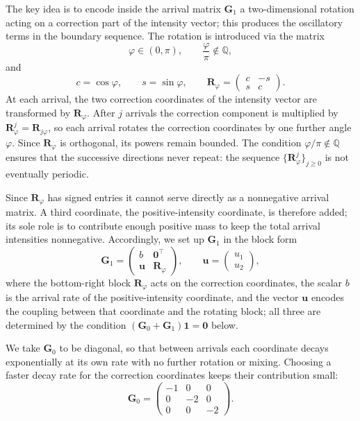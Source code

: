 \documentclass[11pt]{article}
\theoremstyle{definition}
\theoremstyle{remark}
\newcommand{\bzero}{\bm{0}}
\begin{document}
The key idea is to encode inside the arrival matrix $\bm{G}_1$ a two-dimensional rotation acting on a correction part of the intensity vector; this produces the oscillatory terms in the boundary sequence. The rotation is introduced via the matrix
\begin{equation}\label{eq:irrational}
\varphi\in(0,\pi),
\qquad
\frac{\varphi}{\pi}\notin\mathbb{Q},
\end{equation}
and
\[
c=\cos\varphi,
\qquad
s=\sin\varphi,
\qquad
\bm{R}_\varphi=
\begin{pmatrix}
c & -s\\
s & c
\end{pmatrix}.
\]
At each arrival, the two correction coordinates of the intensity vector are transformed by $\bm{R}_\varphi$. After $j$ arrivals the correction component is multiplied by $\bm{R}_\varphi^j = \bm{R}_{j\varphi}$, so each arrival rotates the correction coordinates by one further angle $\varphi$. Since $\bm{R}_\varphi$ is orthogonal, its powers remain bounded. The condition $\varphi/\pi\notin\mathbb{Q}$ ensures that the successive directions never repeat: the sequence $\{\bm{R}_\varphi^j\}_{j\ge 0}$ is not eventually periodic.

Since $\bm{R}_\varphi$ has signed entries it cannot serve directly as a nonnegative arrival matrix. A third coordinate, the positive-intensity coordinate, is therefore added; its sole role is to contribute enough positive mass to keep the total arrival intensities nonnegative. Accordingly, we set up $\bm{G}_1$ in the block form
\begin{equation}\label{eq:G1-shape}
\bm{G}_1=
\begin{pmatrix}
b & \bzero^\top\\
\bm{u} & \bm{R}_\varphi
\end{pmatrix},
\qquad
\bm{u}=
\begin{pmatrix}
u_1\\
u_2
\end{pmatrix},
\end{equation}
where the bottom-right block $\bm{R}_\varphi$ acts on the correction coordinates, the scalar $b$ is the arrival rate of the positive-intensity coordinate, and the vector $\bm{u}$ encodes the coupling between that coordinate and the rotating block; all three are determined by the condition $(\bm{G}_0+\bm{G}_1)\bm{1}=\bzero$ below.

We take $\bm{G}_0$ to be diagonal, so that between arrivals each coordinate decays exponentially at its own rate with no further rotation or mixing. Choosing a faster decay rate for the correction coordinates keeps their contribution small:
\begin{equation}\label{eq:G0-choice}
\bm{G}_0=
\begin{pmatrix}
-1 & 0 & 0\\
0 & -2 & 0\\
0 & 0 & -2
\end{pmatrix}.
\end{equation}
\end{document}
